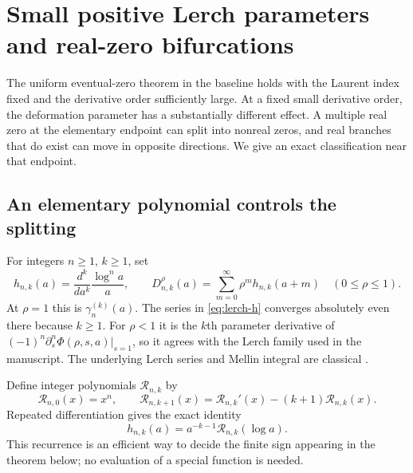 \section{Small positive Lerch parameters and real-zero bifurcations}
\label{sec:lerch}
The uniform eventual-zero theorem in the baseline holds with the Laurent
index fixed and the derivative order sufficiently large. At a fixed small
derivative order, the deformation parameter has a substantially different
effect. A multiple real zero at the elementary endpoint can split into
nonreal zeros, and real branches that do exist can move in opposite
directions. We give an exact classification near that endpoint.

\subsection{An elementary polynomial controls the splitting}
For integers $n\ge1$, $k\ge1$, set
\begin{equation}\label{eq:lerch-h}
 h_{n,k}(a)=\frac{d^k}{da^k}\frac{\log^n a}{a},\qquad
 D_{n,k}^{\rho}(a)=\sum_{m=0}^{\infty}\rho^m h_{n,k}(a+m)
 \quad(0\le\rho\le1).
\end{equation}
At $\rho=1$ this is $\gamma_n^{(k)}(a)$. The series in
\eqref{eq:lerch-h} converges absolutely even there because $k\ge1$.
For $\rho<1$ it is the $k$th parameter derivative of
$(-1)^n\partial_s^n\Phi(\rho,s,a)|_{s=1}$, so it agrees with the
Lerch family used in the manuscript. The underlying Lerch series and
Mellin integral are classical \cite{DLMFLerch,Coffey}.

Define integer polynomials $\mathscr R_{n,k}$ by
\begin{equation}\label{eq:R-recurrence}
 \mathscr R_{n,0}(x)=x^n,\qquad
 \mathscr R_{n,k+1}(x)=\mathscr R_{n,k}'(x)-(k+1)\mathscr R_{n,k}(x).
\end{equation}
Repeated differentiation gives the exact identity
\begin{equation}\label{eq:R-identity}
 h_{n,k}(a)=a^{-k-1}\mathscr R_{n,k}(\log a).
\end{equation}
This recurrence is an efficient way to decide the finite sign appearing
in the theorem below; no evaluation of a special function is needed.

